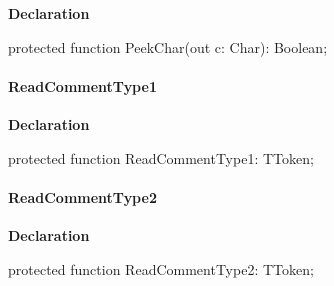 \documentclass{report}
\newif\ifpdf
\begin{document}
\label{PasDoc_Tokenizer.TTokenizer-PeekChar}
\begin{list}{}{
\setlength{\itemindent}{0cm}
\setlength{\listparindent}{0cm}
\setlength{\leftmargin}{\evensidemargin}
\addtolength{\leftmargin}{\tmplength}
\settowidth{\labelsep}{X}
\addtolength{\leftmargin}{\labelsep}
\setlength{\labelwidth}{\tmplength}
}
\item[\textbf{Declaration}\hfill]
\ifpdf
\begin{flushleft}
\fi
\begin{ttfamily}
protected function PeekChar(out c: Char): Boolean;\end{ttfamily}

\ifpdf
\end{flushleft}
\fi

\end{list}
\paragraph*{ReadCommentType1}\hspace*{\fill}

\label{PasDoc_Tokenizer.TTokenizer-ReadCommentType1}
\begin{list}{}{
\setlength{\itemindent}{0cm}
\setlength{\listparindent}{0cm}
\setlength{\leftmargin}{\evensidemargin}
\addtolength{\leftmargin}{\tmplength}
\settowidth{\labelsep}{X}
\addtolength{\leftmargin}{\labelsep}
\setlength{\labelwidth}{\tmplength}
}
\item[\textbf{Declaration}\hfill]
\ifpdf
\begin{flushleft}
\fi
\begin{ttfamily}
protected function ReadCommentType1: TToken;\end{ttfamily}

\ifpdf
\end{flushleft}
\fi

\end{list}
\paragraph*{ReadCommentType2}\hspace*{\fill}

\label{PasDoc_Tokenizer.TTokenizer-ReadCommentType2}
\begin{list}{}{
\setlength{\itemindent}{0cm}
\setlength{\listparindent}{0cm}
\setlength{\leftmargin}{\evensidemargin}
\addtolength{\leftmargin}{\tmplength}
\settowidth{\labelsep}{X}
\addtolength{\leftmargin}{\labelsep}
\setlength{\labelwidth}{\tmplength}
}
\item[\textbf{Declaration}\hfill]
\ifpdf
\begin{flushleft}
\fi
\begin{ttfamily}
protected function ReadCommentType2: TToken;\end{ttfamily}

\ifpdf
\end{flushleft}
\fi

\end{list}
\end{document}
